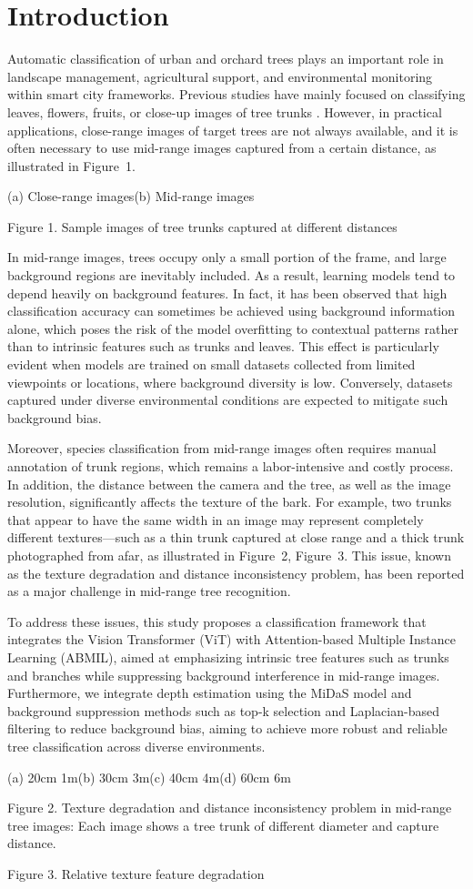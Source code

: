\section{Introduction}
\label{sec:introduction}

Automatic classification of urban and orchard trees plays an important role in landscape management, agricultural support, and environmental monitoring within smart city frameworks\cite{ref4,ref5,ref6,ref7}. Previous studies have mainly focused on classifying leaves, flowers, fruits, or close-up images of tree trunks \cite{ref5,ref6,ref7,ref9,ref10}. However, in practical applications, close-range images of target trees are not always available, and it is often necessary to use mid-range images captured from a certain distance, as illustrated in Figure~1.

(a) Close-range images\quad (b) Mid-range images

Figure 1. Sample images of tree trunks captured at different distances

In mid-range images, trees occupy only a small portion of the frame, and large background regions are inevitably included. As a result, learning models tend to depend heavily on background features. In fact, it has been observed that high classification accuracy can sometimes be achieved using background information alone, which poses the risk of the model overfitting to contextual patterns rather than to intrinsic features such as trunks and leaves. This effect is particularly evident when models are trained on small datasets collected from limited viewpoints or locations, where background diversity is low. Conversely, datasets captured under diverse environmental conditions are expected to mitigate such background bias.

Moreover, species classification from mid-range images often requires manual annotation of trunk regions, which remains a labor-intensive and costly process. In addition, the distance between the camera and the tree, as well as the image resolution, significantly affects the texture of the bark. For example, two trunks that appear to have the same width in an image may represent completely different textures—such as a thin trunk captured at close range and a thick trunk photographed from afar, as illustrated in Figure~2, Figure~3. This issue, known as the texture degradation and distance inconsistency problem, has been reported as a major challenge in mid-range tree recognition.

To address these issues, this study proposes a classification framework that integrates the Vision Transformer (ViT) \cite{ref1} with Attention-based Multiple Instance Learning (ABMIL)\cite{ref2}, aimed at emphasizing intrinsic tree features such as trunks and branches while suppressing background interference in mid-range images. Furthermore, we integrate depth estimation using the MiDaS \cite{ref3} model and background suppression methods such as top-k selection and Laplacian-based filtering to reduce background bias, aiming to achieve more robust and reliable tree classification across diverse environments.

(a) 20cm 1m\quad (b) 30cm 3m\quad (c) 40cm 4m\quad (d) 60cm 6m

Figure 2. Texture degradation and distance inconsistency problem in mid-range tree images: Each image shows a tree trunk of different diameter and capture distance.

Figure 3. Relative texture feature degradation

